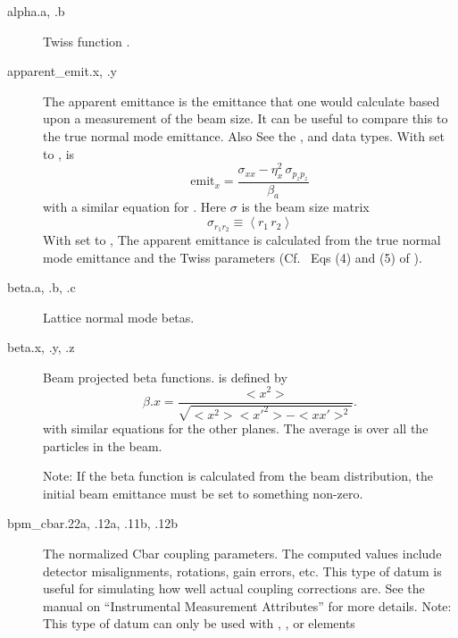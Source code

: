   \begin{description}
  \item[alpha.a, .b] \Newline
Twiss function .
  \item[apparent_emit.x, .y] \Newline
The apparent emittance is the emittance that one would calculate based
upon a measurement of the beam size\cite{b:emit}. It can be useful to
compare this to the true normal mode emittance. Also See the
,  and  data types.
With  set to ,  is
\begin{equation}
  \text{emit}_x = \frac{\sigma_{xx} - \eta_x^2 \, \sigma_{p_zp_z}}{\beta_a}
\end{equation}
with a similar equation for . Here $\sigma$ is the beam size matrix
\begin{equation}
  \sigma_{r_1r_2} \equiv \left< r_1 \, r_2 \right>
\end{equation}
With  set to , The apparent emittance is
calculated from the true normal mode emittance and the Twiss
parameters (Cf.~ Eqs (4) and (5) of \cite{b:emit}).

  \item[beta.a, .b, .c] \Newline
Lattice normal mode betas.

  \item[beta.x, .y, .z] \Newline
Beam projected beta functions.  is defined by
\begin{equation}
  \beta.x = \frac{<x^{2}>}{\sqrt{<x^{2}> <x'^{2}> - <x x'>^{2}}}.
\end{equation}
with similar equations for the other planes.
The average \vn{<>} is over all the particles in the beam.

Note: If the beta function is calculated from the beam distribution,
the initial beam emittance must be set to something non-zero.

  \item[bpm_cbar.22a, .12a, .11b, .12b] \Newline
The normalized Cbar coupling parameters. The computed  values include detector
misalignments, rotations, gain errors, etc. This type of datum is useful for simulating how well
actual coupling corrections are. See the \bmad manual on ``Instrumental Measurement Attributes''
for more details. 
Note: This type of datum can only be used with , ,  or  elements


\end{description}
